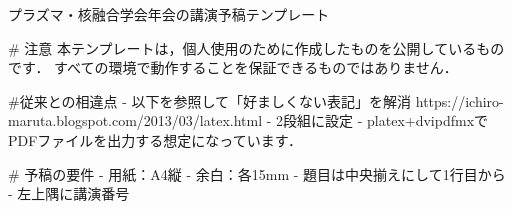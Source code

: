 プラズマ・核融合学会年会の講演予稿テンプレート

# 注意
本テンプレートは，個人使用のために作成したものを公開しているものです．
すべての環境で動作することを保証できるものではありません．

#従来との相違点
- 以下を参照して「好ましくない表記」を解消
  https://ichiro-maruta.blogspot.com/2013/03/latex.html
- 2段組に設定
- platex+dvipdfmxでPDFファイルを出力する想定になっています．

# 予稿の要件
- 用紙：A4縦
- 余白：各15mm
- 題目は中央揃えにして1行目から
- 左上隅に講演番号
